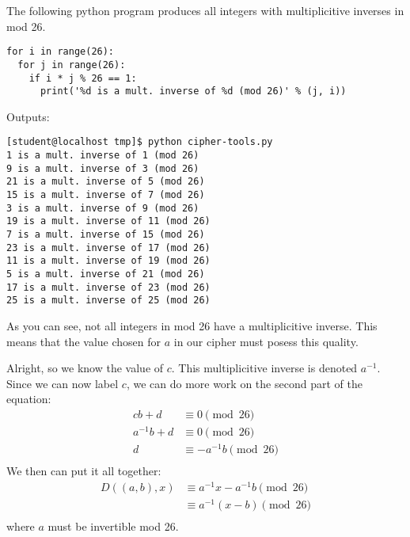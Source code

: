 The following python program produces all integers with multiplicitive
inverses in mod 26.
\begin{Verbatim}[frame=single]
for i in range(26):
  for j in range(26):
    if i * j % 26 == 1:
      print('%d is a mult. inverse of %d (mod 26)' % (j, i))
\end{Verbatim}
Outputs:
\begin{Verbatim}[frame=single]
[student@localhost tmp]$ python cipher-tools.py 
1 is a mult. inverse of 1 (mod 26)
9 is a mult. inverse of 3 (mod 26)
21 is a mult. inverse of 5 (mod 26)
15 is a mult. inverse of 7 (mod 26)
3 is a mult. inverse of 9 (mod 26)
19 is a mult. inverse of 11 (mod 26)
7 is a mult. inverse of 15 (mod 26)
23 is a mult. inverse of 17 (mod 26)
11 is a mult. inverse of 19 (mod 26)
5 is a mult. inverse of 21 (mod 26)
17 is a mult. inverse of 23 (mod 26)
25 is a mult. inverse of 25 (mod 26)
\end{Verbatim}
As you can see, not all integers in mod 26 have a multiplicitive
inverse. This means that the value chosen for $a$ in our cipher
must posess this quality.

Alright, so we know the value of $c$. This multiplicitive
inverse is denoted $a^{-1}$. Since we can now label $c$,
we can do more work on the second part of the equation:
\begin{align*}
  cb + d &\equiv 0 \pmod{26} \\
  a^{-1}b + d &\equiv 0 \pmod{26} \\
  d &\equiv -a^{-1}b \pmod{26} \\
\end{align*}
We then can put it all together:
\begin{align*}
  D((a, b), x) &\equiv a^{-1}x - a^{-1}b \pmod{26} \\
  &\equiv a^{-1}(x - b) \pmod{26} \\
\end{align*}
where $a$ must be invertible mod 26. 

